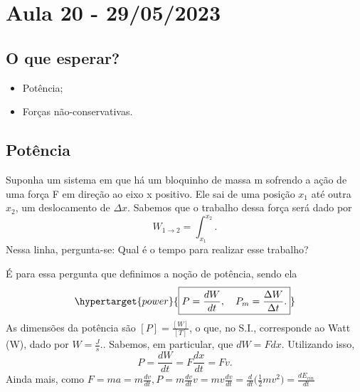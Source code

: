 \documentclass[PhysicsI/physics_notes.tex]{subfiles}
\begin{document}
\section{Aula 20 - 29/05/2023}
\subsection{O que esperar?}
\begin{itemize}
	\item Potência;
	\item Forças não-conservativas.
\end{itemize}
\subsection{Potência}
Suponha um sistema em que há um bloquinho de massa m sofrendo a ação de uma força F
em direção ao eixo x positivo. Ele sai de uma posição \(x_{1}\) até outra
\(x_{2}\), um deslocamento de \(\Delta x\). Sabemos que o trabalho dessa força será
dado por
\[
	W_{1\rightarrow2} = \int_{x_{1}}^{x_{2}}.
\]
Nessa linha, pergunta-se: Qual é o tempo para realizar esse trabalho?

É para essa pergunta que definimos a noção de potência, sendo ela
\[
	\hypertarget{power}{\boxed{P = \frac{dW}{dt},\quad P_{m} = \frac{\Delta W}{\Delta t}.}}
\]
As dimensões da potência são \([P]=\frac{[W]}{[T]}\), o que, no S.I., corresponde ao Watt (W), dado por
\(W = \frac{J}{s}.\). Sabemos, em particular, que \(dW = Fdx.\) Utilizando isso,
\[
	P = \frac{dW}{dt} = F \frac{dx}{dt} = Fv.
\]
Ainda mais, como \(F = m a = m \frac{dv}{dt}, P=m \frac{dv}{dt}v = mv \frac{dv}{dt} = \frac{d}{dt}\biggl(\frac{1}{2}mv^{2}\biggr) = \frac{dE_{cin}}{dt}\)
\end{document}
